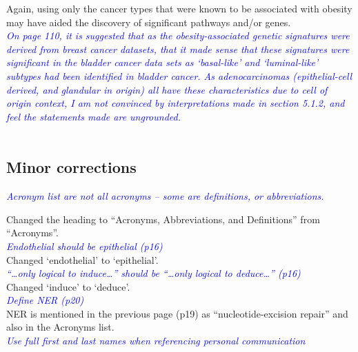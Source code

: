\documentclass[a4paper, 12pt]{article}
\begin{document}
Again, using only the cancer types that were known to be associated with obesity may have aided the discovery of significant pathways and/or genes.
\\


\noindent
\textcolor{blue}{
\textit{On page 110, it is suggested that as the obesity-associated genetic signatures were derived from breast cancer datasets, that it made sense that these signatures were significant in the bladder cancer data sets as `basal-like' and `luminal-like' subtypes had been identified in bladder cancer.
As adenocarcinomas (epithelial-cell derived, and glandular in origin) all have these characteristics due to cell of origin context, I am not convinced by interpretations made in section 5.1.2, and feel the statements made are ungrounded.
}
}\\

\noindent
\\

\subsection*{Minor corrections}
\label{sub:minor_corrections}

\noindent
\textcolor{blue}{
\textit{Acronym list are not all acronyms -- some are definitions, or abbreviations.
}
}

\noindent
Changed the heading to ``Acronyms, Abbreviations, and Definitions'' from ``Acronyms''.
\\

\noindent
\textcolor{blue}{
\textit{Endothelial should be epithelial (p16)
}
}\\

\noindent
Changed `endothelial' to `epithelial'.
\\

\noindent
\textcolor{blue}{
\textit{``\ldots only logical to induce\ldots'' should be ``\ldots only logical to deduce\ldots'' (p16)
}
}\\

\noindent
Changed `induce' to `deduce'.
\\

\noindent
\textcolor{blue}{
\textit{Define NER (p20)
}
}\\

\noindent
NER is mentioned in the previous page (p19) as ``nucleotide-excision repair'' and also in the Acronyms list.
\\

\noindent
\textcolor{blue}{
\textit{Use full first and last names when referencing personal communication
}
}\\
\end{document}
